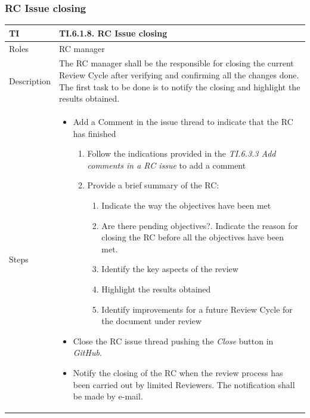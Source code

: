 \documentclass{template/openetcs_article}
\begin{document}
\subsubsection{RC Issue closing}

\begin{flushleft}
\tablefirsthead{}
\tablehead{}
\tabletail{}
\tablelasttail{}
\begin{supertabular}{|m{2cm}|m{13cm}|}
\hline
{}
TI & 
TI.6.1.8. RC Issue closing
\\\hline
Roles &
RC manager
\\\hline
Description &
The RC manager shall be the responsible for closing the current Review Cycle after verifying and confirming all the changes done. The first task to be done is to notify the closing and highlight the results obtained.
\\\hline
Steps &
\begin{itemize}
\item Add a Comment in the issue thread to indicate that the RC has finished
\begin{enumerate}
\item Follow the indications provided in the {\it TI.6.3.3 Add comments in a RC issue} to add a comment
\item Provide a brief summary of the RC:
\begin{enumerate}
\item Indicate the way the objectives have been met 
\item Are there pending objectives?. Indicate the reason for closing the RC before all the objectives have been met.
\item Identify the key aspects of the review
\item Highlight the results obtained
\item Identify improvements for a future Review Cycle for the document under review
\end{enumerate}
\end{enumerate}
\item Close the RC issue thread pushing the {\it Close} button in {\it GitHub}.
\item Notify the closing of the RC when the review process has been carried out by limited Reviewers. The notification shall be made by e-mail.
\end{itemize}
\\\hline
\end{supertabular}
\end{flushleft}
\end{document}
